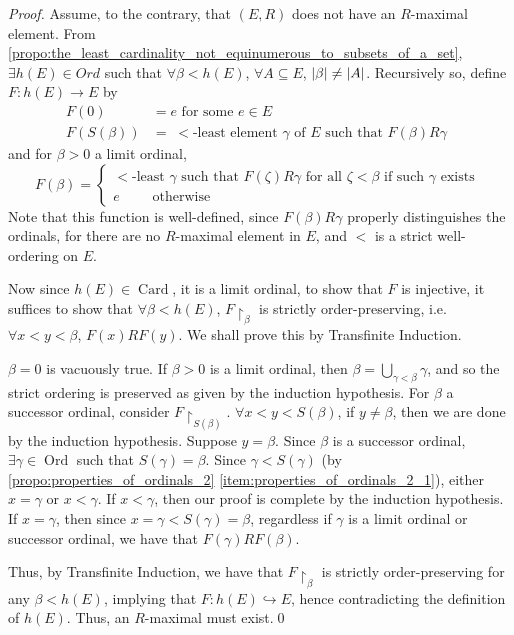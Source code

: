 \documentclass[notoc,notitlepage]{tufte-book}
\DeclareMathOperator{\Ord}{Ord }
\DeclareMathOperator{\Card}{Card }
\begin{document}
\begin{proof}
  Assume, to the contrary, that $(E, R)$ does not have an $R$-maximal element. From \cref{propo:the_least_cardinality_not_equinumerous_to_subsets_of_a_set}, $\exists h(E) \in Ord$ such that $\forall \beta < h(E)$, $\forall A \subseteq E$, $\left|\beta\right| \neq \left|A\right|$. Recursively so, define $F : h(E) \to E$ by
  \begin{align*}
    F(0)         & = e \text{ for some } e \in E \\
    F(S(\beta)) & = \; < \text{-least element } \gamma \text{ of } E \text{ such that } F(\beta)R\gamma \enspace
  \end{align*}
  and for $\beta > 0$ a limit ordinal,
  \begin{equation*}
    F(\beta) = \begin{cases}
      < \text{-least } \gamma \text{ such that } F(\zeta) R \gamma \text{ for all } \zeta < \beta \text{ if such } \gamma \text{ exists } \\
      e \qquad \text{ otherwise}
    \end{cases}
  \end{equation*}
  Note that this function is well-defined, since $F(\beta)R\gamma$ properly distinguishes the ordinals, for there are no $R$-maximal element in $E$, and $<$ is a strict well-ordering on $E$.

  Now since $h(E) \in \Card$, it is a limit ordinal, to show that $F$ is injective, it suffices to show that $\forall \beta < h(E)$, $F \restriction_\beta$ is strictly order-preserving, i.e.\ $\forall x < y < \beta$, $F(x) R F(y)$. We shall prove this by Transfinite Induction.

  $\beta = 0$ is vacuously true. If $\beta > 0$ is a limit ordinal, then $\beta = \bigcup_{\gamma < \beta} \gamma$, and so the strict ordering is preserved as given by the induction hypothesis. For $\beta$ a successor ordinal, consider $F \restriction_{S(\beta)}$. $\forall x < y < S(\beta)$, if $y \neq \beta$, then we are done by the induction hypothesis. Suppose $y = \beta$. Since $\beta$ is a successor ordinal, $\exists \gamma \in \Ord$ such that $S(\gamma) = \beta$. Since $\gamma < S(\gamma)$ (by \cref{propo:properties_of_ordinals_2} \cref{item:properties_of_ordinals_2_1}), either $x = \gamma$ or $x < \gamma$. If $x < \gamma$, then our proof is complete by the induction hypothesis. If $x = \gamma$, then since $x = \gamma < S(\gamma) = \beta$, regardless if $\gamma$ is a limit ordinal or successor ordinal, we have that $F(\gamma) R F(\beta)$.

  Thus, by Transfinite Induction, we have that $F \restriction_\beta$ is strictly order-preserving for any $\beta < h(E)$, implying that $F : h(E) \hookrightarrow E$, hence contradicting the definition of $h(E)$. Thus, an $R$-maximal must exist.\qed\
\end{proof}
\end{document}
